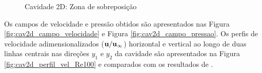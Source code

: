 \begin{figure}[!htbp]
	\caption{Cavidade 2D: Zona de sobreposição}
	\centering
\end{figure}

Os campos de velocidade e pressão obtidos são apresentados nas Figura \ref{fig:cav2d_campo_velocidade} e Figura \ref{fig:cav2d_campo_pressao}. Os perfis de velocidade adimensionalizados ($\mathbf{u}/\mathbf{u}_{\infty}$) horizontal e vertical ao longo de duas linhas centrais nas direções $y_1$ e $y_2$ da cavidade são apresentados na Figura \ref{fig:cav2d_perfil_vel_Re100} e comparados com os resultados de .

